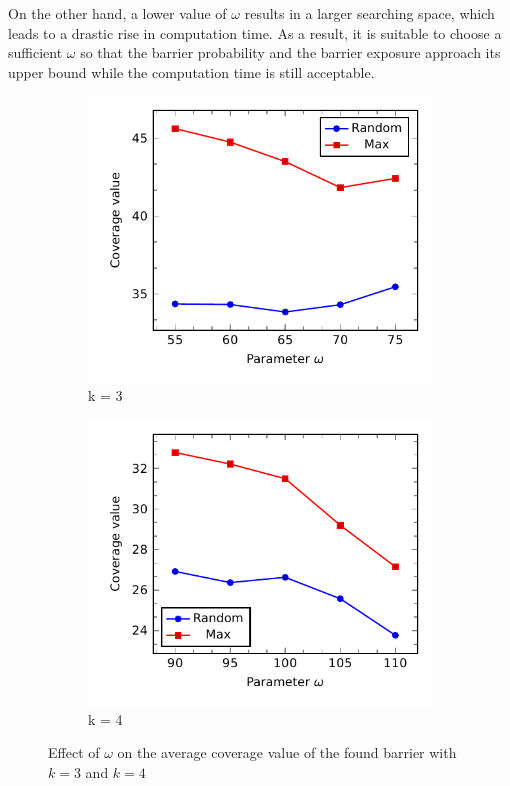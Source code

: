 On the other hand, a lower value of $\omega$ results in a larger searching space, which leads to a drastic rise in computation time. As a result, it is suitable to choose a sufficient $\omega$ so that the barrier probability and the barrier exposure approach its upper bound while the computation time is still acceptable.

\begin{figure}[h]
	\begin{subfigure}[t]{.5\textwidth}
		\centering
		\includegraphics[scale=.8]{Hinhanh/OmegaEffect/coverage/k4.pdf}
		\caption{k = 3}
	\end{subfigure}
	\begin{subfigure}[t]{.5\textwidth}
		\centering
		\includegraphics[scale=.8]{Hinhanh/OmegaEffect/coverage/k3.pdf}		
		\caption{k = 4}
	\end{subfigure}
\caption{Effect of $\omega$ on the average coverage value of the found barrier with $k = 3$ and $k = 4$}
\label{fig:}
\end{figure}
